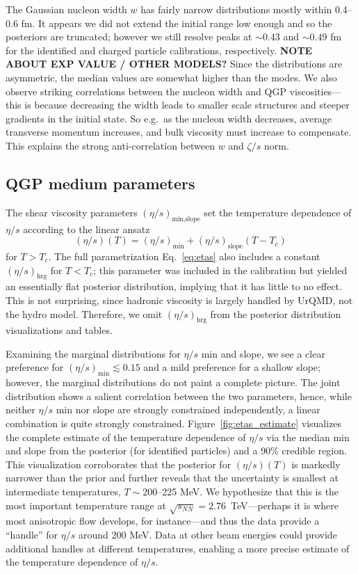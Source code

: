\documentclass[aps,prc,reprint,amsmath,nofootinbib,superscriptaddress]{revtex4-1}
\newcommand{\sqrts}{\sqrt{s_{NN}}}
\begin{document}
The Gaussian nucleon width $w$ has fairly narrow distributions mostly within 0.4--0.6 fm.
It appears we did not extend the initial range low enough and so the posteriors are truncated;
however we still resolve peaks at ${\sim}0.43$ and ${\sim}0.49$ fm for the identified and charged particle calibrations, respectively.
\textbf{NOTE ABOUT EXP VALUE / OTHER MODELS?}
Since the distributions are asymmetric, the median values are somewhat higher than the modes.
We also observe striking correlations between the nucleon width and QGP viscosities---this is because decreasing the width leads to smaller scale structures and steeper gradients in the initial state.
So e.g.\ as the nucleon width decreases, average transverse momentum increases, and bulk viscosity must increase to compensate.
This explains the strong anti-correlation between $w$ and $\zeta/s$ norm.

\subsection{QGP medium parameters}

The shear viscosity parameters $(\eta/s)_\text{min,slope}$ set the temperature dependence of $\eta/s$ according to the linear ansatz
\begin{equation}
  (\eta/s)(T) = (\eta/s)_\text{min} + (\eta/s)_\text{slope} (T - T_c)
\end{equation}
for $T > T_c$.
The full parametrization Eq.~\eqref{eq:etas} also includes a constant $(\eta/s)_\text{hrg}$ for $T < T_c$; this parameter was included in the calibration but yielded an essentially flat posterior distribution, implying that it has little to no effect.
This is not surprising, since hadronic viscosity is largely handled by UrQMD, not the hydro model.
Therefore, we omit $(\eta/s)_\text{hrg}$ from the posterior distribution visualizations and tables.

Examining the marginal distributions for $\eta/s$ min and slope, we see a clear preference for $(\eta/s)_\text{min} \lesssim 0.15$ and a mild preference for a shallow slope;
however, the marginal distributions do not paint a complete picture.
The joint distribution shows a salient correlation between the two parameters, hence, while neither $\eta/s$ min nor slope are strongly constrained independently, a linear combination is quite strongly constrained.
Figure~\ref{fig:etas_estimate} visualizes the complete estimate of the temperature dependence of $\eta/s$ via the median min and slope from the posterior (for identified particles) and a 90\% credible region.
This visualization corroborates that the posterior for $(\eta/s)(T)$ is markedly narrower than the prior and further reveals that the uncertainty is smallest at intermediate temperatures, $T \sim {}$200--225 MeV.
We hypothesize that this is the most important temperature range at $\sqrts = 2.76$~TeV---perhaps it is where most anisotropic flow develops, for instance---and thus the data provide a ``handle'' for $\eta/s$ around 200 MeV.
Data at other beam energies could provide additional handles at different temperatures, enabling a more precise estimate of the temperature dependence of $\eta/s$.
\end{document}
